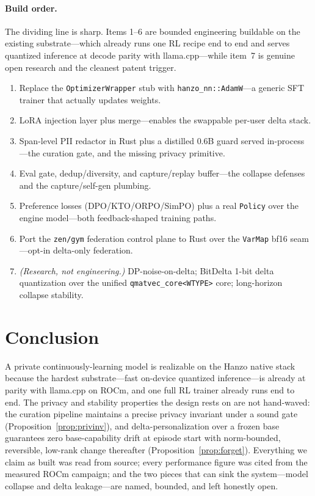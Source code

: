 \documentclass[11pt]{article}
\begin{document}
\paragraph{Build order.}
The dividing line is sharp. Items 1--6 are bounded engineering buildable on the existing substrate---which already runs one RL recipe end to end and serves quantized inference at decode parity with llama.cpp---while item~7 is genuine open research and the cleanest patent trigger.
\begin{enumerate}
    \item Replace the \texttt{OptimizerWrapper} stub with \texttt{hanzo\_nn::AdamW}---a generic SFT trainer that actually updates weights.
    \item LoRA injection layer plus merge---enables the swappable per-user delta stack.
    \item Span-level PII redactor in Rust plus a distilled $0.6$B guard served in-process---the curation gate, and the missing privacy primitive.
    \item Eval gate, dedup/diversity, and capture/replay buffer---the collapse defenses and the capture/self-gen plumbing.
    \item Preference losses (DPO/KTO/ORPO/SimPO) plus a real \texttt{Policy} over the engine model---both feedback-shaped training paths.
    \item Port the \texttt{zen/gym} federation control plane to Rust over the \texttt{VarMap} bf16 seam---opt-in delta-only federation.
    \item \emph{(Research, not engineering.)} DP-noise-on-delta; BitDelta 1-bit delta quantization over the unified \texttt{qmatvec\_core<WTYPE>} core; long-horizon collapse stability.
\end{enumerate}

\section{Conclusion}

A private continuously-learning model is realizable on the Hanzo native stack because the hardest substrate---fast on-device quantized inference---is already at parity with llama.cpp on ROCm, and one full RL trainer already runs end to end. The privacy and stability properties the design rests on are not hand-waved: the curation pipeline maintains a precise privacy invariant under a sound gate (Proposition~\ref{prop:privinv}), and delta-personalization over a frozen base guarantees zero base-capability drift at episode start with norm-bounded, reversible, low-rank change thereafter (Proposition~\ref{prop:forget}). Everything we claim as built was read from source; every performance figure was cited from the measured ROCm campaign; and the two pieces that can sink the system---model collapse and delta leakage---are named, bounded, and left honestly open.
\end{document}
